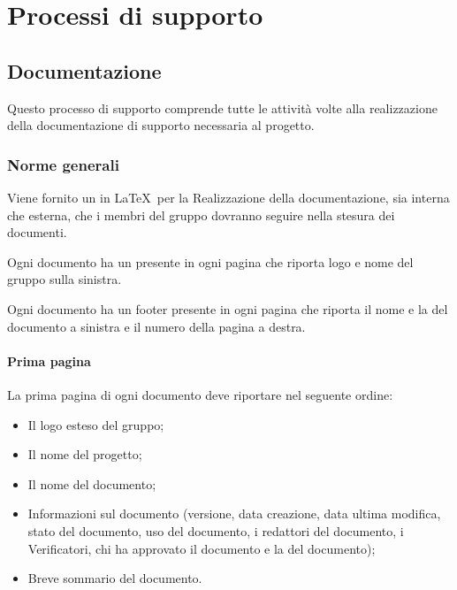 \section{Processi di supporto}


\subsection{Documentazione}
Questo processo di supporto comprende tutte le attività volte alla realizzazione della documentazione di supporto necessaria al progetto.


\subsubsection{Norme generali}


Viene fornito un  in \LaTeX\ per la Realizzazione della documentazione, sia interna che esterna, che i membri del gruppo dovranno seguire nella stesura dei documenti.


Ogni documento ha un  presente in ogni pagina che riporta logo e nome del gruppo sulla sinistra.

Ogni documento ha un footer presente in ogni pagina che riporta il nome e la  del documento a sinistra e il numero della pagina a destra.

\paragraph{Prima pagina}
\label{5.2.3}
La prima pagina di ogni documento deve riportare nel seguente ordine:
\begin{itemize}
\item Il logo esteso del gruppo;
\item Il nome del progetto;
\item Il nome del documento;
\item Informazioni sul documento (versione, data creazione, data ultima modifica, stato del documento, uso del documento, i redattori del documento, i Verificatori, chi ha approvato il documento e la  del documento);
\item Breve sommario del documento.
\end{itemize}

